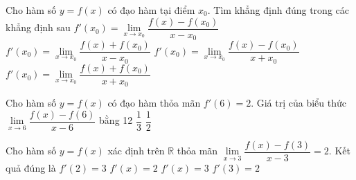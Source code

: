 

\begin{ex}%
	Cho hàm số $ y=f(x)  $ có đạo hàm tại điểm $ x_{0} $. Tìm khẳng định đúng trong các khẳng định sau
	\choice 
		{\True $  f'\left(x_{0}\right)=\lim\limits_{x \rightarrow x_{0}} \dfrac{f(x)-f\left(x_{0}\right)}{x-x_{0}} $}
		 {$ f'\left(x_{0}\right)=\lim\limits_{x \rightarrow x_{0}} \dfrac{f(x)+f\left(x_{0}\right)}{x-x_{0}} $}
		{$ f'\left(x_{0}\right)=\lim\limits_{x \rightarrow x_{0}}  \dfrac{f(x)-f\left(x_{0}\right)}{x+x_{0}} $}
		{$ f'\left(x_{0}\right)=\lim\limits_{x \rightarrow x_{0}}  \dfrac{f(x)+f\left(x_{0}\right)}{x+x_{0}} $}
\end{ex}

\begin{ex}%
	Cho hàm số $ y=f(x) $ có đạo  hàm thỏa mãn $ f'(6)=2 $. Giá trị của biểu thức $ \lim\limits_{x \rightarrow 6} \dfrac{f(x)-f(6)}{x-6} $ bằng
	\choice 
		 {12}
		{} 
		{$\dfrac{1}{3}$} 
		 {$\dfrac{1}{2}$}
\end{ex}

\begin{ex}%
	Cho hàm số $  y=f(x) $ xác định trên $ \mathbb{R} $ thỏa mãn $ \lim\limits_{x \rightarrow 3} \dfrac{f(x)-f(3)}{x-3}=2 $. Kết quả đúng là
	 \choice
		{$ f'(2)=3  $}
		{$ f'(x)=2  $}
		{$ f'(x)=3  $}
		{\True $ f'(3)=2 $} 
\end{ex}

